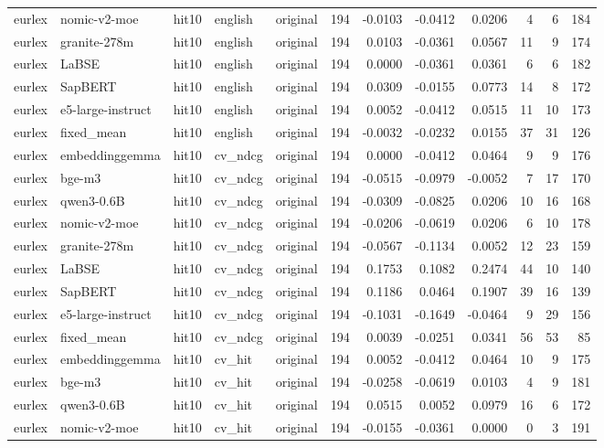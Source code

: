\begin{tabular}{lllllrrrrrrr}
eurlex & nomic-v2-moe & hit10 & english & original & 194 & -0.0103 & -0.0412 & 0.0206 & 4 & 6 & 184 \\
eurlex & granite-278m & hit10 & english & original & 194 & 0.0103 & -0.0361 & 0.0567 & 11 & 9 & 174 \\
eurlex & LaBSE & hit10 & english & original & 194 & 0.0000 & -0.0361 & 0.0361 & 6 & 6 & 182 \\
eurlex & SapBERT & hit10 & english & original & 194 & 0.0309 & -0.0155 & 0.0773 & 14 & 8 & 172 \\
eurlex & e5-large-instruct & hit10 & english & original & 194 & 0.0052 & -0.0412 & 0.0515 & 11 & 10 & 173 \\
eurlex & fixed\_mean & hit10 & english & original & 194 & -0.0032 & -0.0232 & 0.0155 & 37 & 31 & 126 \\
eurlex & embeddinggemma & hit10 & cv\_ndcg & original & 194 & 0.0000 & -0.0412 & 0.0464 & 9 & 9 & 176 \\
eurlex & bge-m3 & hit10 & cv\_ndcg & original & 194 & -0.0515 & -0.0979 & -0.0052 & 7 & 17 & 170 \\
eurlex & qwen3-0.6B & hit10 & cv\_ndcg & original & 194 & -0.0309 & -0.0825 & 0.0206 & 10 & 16 & 168 \\
eurlex & nomic-v2-moe & hit10 & cv\_ndcg & original & 194 & -0.0206 & -0.0619 & 0.0206 & 6 & 10 & 178 \\
eurlex & granite-278m & hit10 & cv\_ndcg & original & 194 & -0.0567 & -0.1134 & 0.0052 & 12 & 23 & 159 \\
eurlex & LaBSE & hit10 & cv\_ndcg & original & 194 & 0.1753 & 0.1082 & 0.2474 & 44 & 10 & 140 \\
eurlex & SapBERT & hit10 & cv\_ndcg & original & 194 & 0.1186 & 0.0464 & 0.1907 & 39 & 16 & 139 \\
eurlex & e5-large-instruct & hit10 & cv\_ndcg & original & 194 & -0.1031 & -0.1649 & -0.0464 & 9 & 29 & 156 \\
eurlex & fixed\_mean & hit10 & cv\_ndcg & original & 194 & 0.0039 & -0.0251 & 0.0341 & 56 & 53 & 85 \\
eurlex & embeddinggemma & hit10 & cv\_hit & original & 194 & 0.0052 & -0.0412 & 0.0464 & 10 & 9 & 175 \\
eurlex & bge-m3 & hit10 & cv\_hit & original & 194 & -0.0258 & -0.0619 & 0.0103 & 4 & 9 & 181 \\
eurlex & qwen3-0.6B & hit10 & cv\_hit & original & 194 & 0.0515 & 0.0052 & 0.0979 & 16 & 6 & 172 \\
eurlex & nomic-v2-moe & hit10 & cv\_hit & original & 194 & -0.0155 & -0.0361 & 0.0000 & 0 & 3 & 191 \\

\end{tabular}
